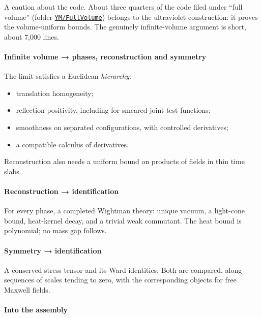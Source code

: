 \documentclass[
  letterpaper,
  11pt]{article}
\providecommand{\tightlist}{%
  \setlength{\itemsep}{0pt}\setlength{\parskip}{0pt}}
\begin{document}
A caution about the code. About three quarters of the code filed under
``full volume'' (folder
\href{https://github.com/yang-mills-group/OpenAI-YM-20261028/tree/3456e5e75cf8d4cd558955a5c7638fba2d68f464/YM/FullVolume}{\texttt{YM/FullVolume}})
belongs to the ultraviolet construction: it proves the volume-uniform
bounds. The genuinely infinite-volume argument is short, about 7,000
lines.

\paragraph{Infinite volume → phases, reconstruction and
symmetry}\label{infinite-volume-phases-reconstruction-and-symmetry}

The limit satisfies a Euclidean \emph{hierarchy}:

\begin{itemize}
\tightlist
\item
  translation homogeneity;
\item
  reflection positivity, including for smeared joint test functions;
\item
  smoothness on separated configurations, with controlled derivatives;
\item
  a compatible calculus of derivatives.
\end{itemize}

Reconstruction also needs a uniform bound on products of fields in thin
time slabs.

\paragraph{Reconstruction →
identification}\label{reconstruction-identification}

For every phase, a completed Wightman theory: unique vacuum, a
light-cone bound, heat-kernel decay, and a trivial weak commutant. The
heat bound is polynomial; no mass gap follows.

\paragraph{Symmetry → identification}\label{symmetry-identification}

A conserved stress tensor and its Ward identities. Both are compared,
along sequences of scales tending to zero, with the corresponding
objects for free Maxwell fields.

\paragraph{Into the assembly}\label{into-the-assembly}
\end{document}

